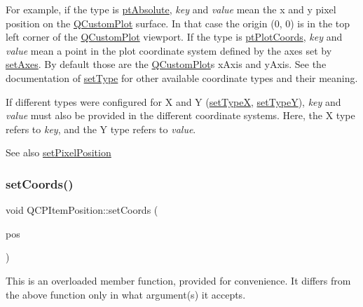 For example, if the type is \hyperlink{classQCPItemPosition_aad9936c22bf43e3d358552f6e86dbdc8a564f5e53e550ead1ec5fc7fc7d0b73e0}{pt\+Absolute}, {\itshape key} and {\itshape value} mean the x and y pixel position on the \hyperlink{classQCustomPlot}{Q\+Custom\+Plot} surface. In that case the origin (0, 0) is in the top left corner of the \hyperlink{classQCustomPlot}{Q\+Custom\+Plot} viewport. If the type is \hyperlink{classQCPItemPosition_aad9936c22bf43e3d358552f6e86dbdc8ad5ffb8dc99ad73263f7010c77342294c}{pt\+Plot\+Coords}, {\itshape key} and {\itshape value} mean a point in the plot coordinate system defined by the axes set by \hyperlink{classQCPItemPosition_a2185f45c75ac8cb9be89daeaaad50e37}{set\+Axes}. By default those are the \hyperlink{classQCustomPlot}{Q\+Custom\+Plot}\textquotesingle{}s x\+Axis and y\+Axis. See the documentation of \hyperlink{classQCPItemPosition_aa476abf71ed8fa4c537457ebb1a754ad}{set\+Type} for other available coordinate types and their meaning.

If different types were configured for X and Y (\hyperlink{classQCPItemPosition_a2113b2351d6d00457fb3559a4e20c3ea}{set\+TypeX}, \hyperlink{classQCPItemPosition_ac2a454aa5a54c1615c50686601ec4510}{set\+TypeY}), {\itshape key} and {\itshape value} must also be provided in the different coordinate systems. Here, the X type refers to {\itshape key}, and the Y type refers to {\itshape value}.

\begin{DoxySeeAlso}{See also}
\hyperlink{classQCPItemPosition_a8d4f858f2089973967cf9cb81970ef0a}{set\+Pixel\+Position} 
\end{DoxySeeAlso}
\mbox{\label{classQCPItemPosition_acc70b3abc143287f806e5f154e5e07b0}} 
\subsubsection{\texorpdfstring{set\+Coords()}{setCoords()}\hspace{0.1cm}{\footnotesize\ttfamily [2/2]}}
{\footnotesize\ttfamily void Q\+C\+P\+Item\+Position\+::set\+Coords (\begin{DoxyParamCaption}\item[{const Q\+PointF \&}]{pos }\end{DoxyParamCaption})}

This is an overloaded member function, provided for convenience. It differs from the above function only in what argument(s) it accepts.

